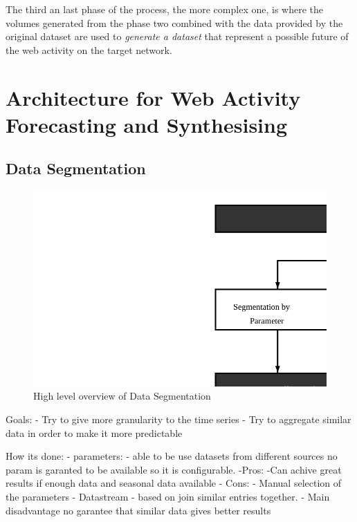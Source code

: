 The third an last phase of the process, the more complex one, is where the volumes
generated from the phase two combined with the data provided by the original
dataset are used to \emph{generate a dataset} that represent a possible future of the
web activity on the target network.

\section{Architecture for Web Activity Forecasting and Synthesising}

\subsection{Data Segmentation}

\begin{figure}[h] \begin{center} \leavevmode
\includegraphics[]{segmentation} \caption{ High level overview
of Data Segmentation} \label{fig:segmentation_arch} \end{center} \end{figure}

Goals:
- Try to give more granularity to the time series 
- Try to aggregate similar data in order to make it more predictable

How its done:
- parameters:
 - able to be use datasets from different sources no param is garanted to be
 available so it is configurable. 
   -Pros:
     -Can achive great results if enough data and seasonal data available 
  - Cons:
    - Manual selection of the parameters
- Datastream
  - based on join similar entries together.
  - Main disadvantage no garantee that similar data gives better results

